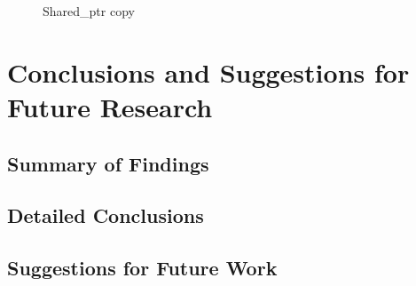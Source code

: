\documentclass[11pt]{book}
\begin{document}
\begin{figure}
\begin{minipage}{.5\textwidth}
\begin{center}
      Shared\_ptr copy \\
    \end{center}
  \end{minipage}
\end{figure}

\chapter[Conclusions \& Future Research]{Conclusions and Suggestions for Future Research}
\label{conclude}



\section{Summary of Findings}

\section{Detailed Conclusions}

\section{Suggestions for Future Work}




 \markright{ }
\end{document}
